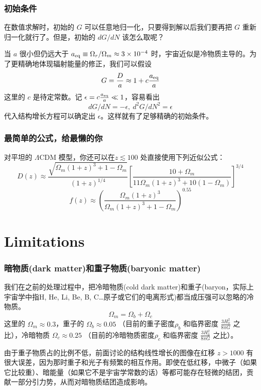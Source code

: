 \documentclass[CJK,13pt]{beamer}
\begin{document}


    
  \begin{frame}
    \frametitle{初始条件}
    在数值求解时，初始的 $G$ 可以任意地归一化，只要得到解以后我们要再把 $G$ 重新归一化就行了。但是，初始的 $dG/dN$ 该怎么取呢？
    
    当 $a$ 很小但仍远大于 $a_{\rm eq}\equiv \Omega_r/\Omega_m\approx 3\times 10^{-4}$ 时，宇宙近似是冷物质主导的。为了更精确地体现辐射能量的修正，我们可以假设
    $$ G = \frac{D}{a} \approx 1 + c\frac{a_{\rm eq}}{a}$$
    这里的 $c$ 是待定常数。记 $\epsilon = c\frac{a_{\rm eq}}{a} \ll 1$，容易看出
    $$ dG/dN = -\epsilon, \ d^2G/dN^2 = \epsilon$$
    代入结构增长方程可以确定出 $\epsilon$。这样就有了足够精确的初始条件。
  \end{frame}


  \begin{frame}
    \frametitle{最简单的公式，给最懒的你}
    对{\blue 平坦的 $\Lambda$CDM 模型}，你还可以在{\blue $z\lesssim 100$ 处}直接使用下列近似公式：
    $$ D(z) \approx \frac{\sqrt{\Omega_m(1+z)^3+1-\Omega_m}}{(1+z)^{1/4}}\left[\frac{10+\Omega_m}{11\Omega_m(1+z)^3+10(1-\Omega_m)}\right]^{3/4}$$
    $$ f(z) \approx \left(\frac{\Omega_m(1+z)^3}{\Omega_m(1+z)^3+1-\Omega_m }\right)^{0.55}$$
  \end{frame}

  \section{Limitations}


  \begin{frame}
    \frametitle{暗物质(dark matter)和重子物质(baryonic matter)}
    我们在之前的处理过程中，把冷暗物质(cold dark matter)和重子(baryon，实际上宇宙学中指H, He, Li, Be, B, C\ldots 原子或它们的电离形式)都当成压强可以忽略的冷物质。
    $$\Omega_m = \Omega_b + \Omega_c$$
    这里的 $\Omega_m\approx 0.3$，重子的 $\Omega_b \approx 0.05$ （目前的重子密度$\rho_b$ 和临界密度 $\frac{3H_0^2}{8\pi G}$ 之比），冷暗物质 $\Omega_c \approx 0.25$ （目前的冷暗物质密度$\rho_c$ 和临界密度 $\frac{3H_0^2}{8\pi G}$ 之比）。

    \skipline
    
    由于重子物质占的比例不低，前面讨论的结构线性增长的图像{\blue 在红移 $z>1000$ 有很大误差}，因为那时重子和光子有频繁的相互作用。即使在低红移，中微子（如果它比较重）、暗能量（如果它不是宇宙学常数的话）等都可能存在轻微的结团，贡献一部分引力势，从而对暗物质结团造成影响。
  \end{frame}
\end{document}
